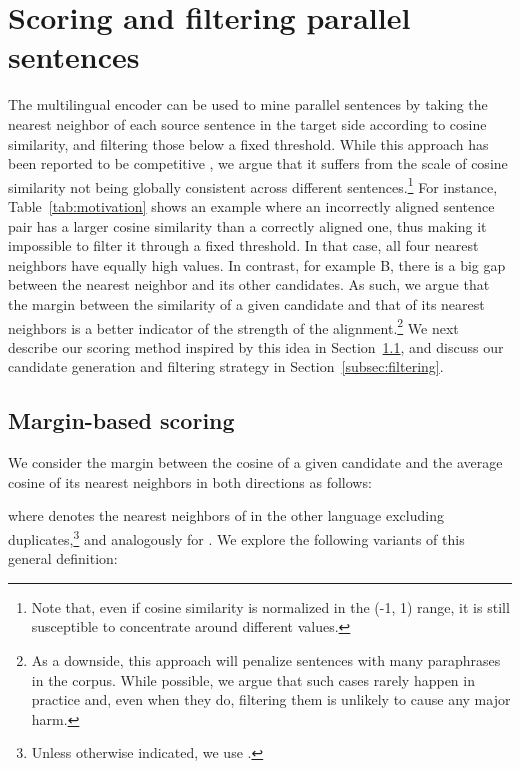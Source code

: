 \documentclass[11pt,a4paper]{article}
\begin{document}
\vspace{-0pt}
\section{Scoring and filtering parallel sentences}
\label{sec:mining}

The multilingual encoder can be used to mine parallel sentences by taking the nearest neighbor of each source sentence in the target side according to cosine similarity, and filtering those below a fixed threshold. While this approach has been reported to be competitive \citep{schwenk2018filtering}, we argue that it suffers from the scale of cosine similarity not being globally consistent across different sentences.\footnote{Note that, even if cosine similarity is normalized in the (-1, 1) range,
it is still susceptible to concentrate around different values.} For instance, Table~\ref{tab:motivation} shows an example where an incorrectly aligned sentence pair has a larger cosine similarity than a correctly aligned one, thus making it impossible to filter it through a fixed threshold. In that case, all four nearest neighbors have equally high values. In contrast, for example B, there is a big gap between the nearest neighbor and its other candidates. As such, we argue that the margin between the similarity of a given candidate and that of its  nearest neighbors is a better indicator of the strength of the alignment.\footnote{As a downside, this approach will penalize sentences with many paraphrases in the corpus. While possible, we argue that such cases rarely happen in practice and, even when they do, filtering them is unlikely to cause any major harm.} We next describe our scoring method inspired by this idea in Section~\ref{subsec:scoring}, and discuss our candidate generation and filtering strategy in Section~\ref{subsec:filtering}.

\InsertFigArchi




\subsection{Margin-based scoring} \label{subsec:scoring}

We consider the margin between the cosine of a given candidate and the average cosine of its  nearest neighbors in both directions as follows:

where  denotes the  nearest neighbors of  in the other language excluding duplicates,\footnote{Unless otherwise indicated, we use .} and analogously for . We explore the following variants of this general definition:
\end{document}
